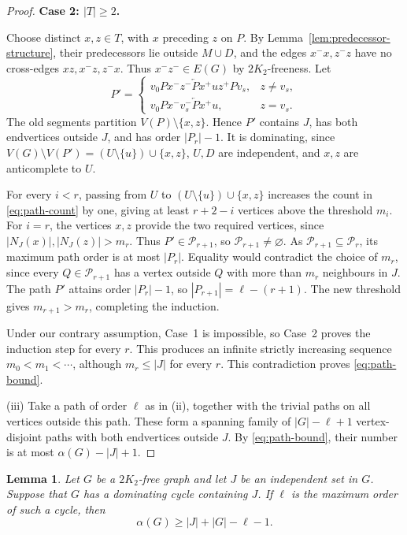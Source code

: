 \documentclass[11pt]{article}
\numberwithin{equation}{section}
\newtheorem{lemma}[theorem]{Lemma}
\theoremstyle{plain}
\theoremstyle{definition}
\theoremstyle{plain}
\begin{document}
\begin{proof}
\medskip
\noindent
\textbf{Case 2: $|T|\geq2$.}

Choose distinct $x,z\in T$, with $x$ preceding $z$ on $P$.
By Lemma~\ref{lem:predecessor-structure}, their predecessors
lie outside $M\cup D$, and the edges $x^-x,z^-z$ have no
cross-edges $xz,x^-z,z^-x$.
Thus $x^-z^-\in E(G)$ by $2K_2$-freeness. Let
\[
P'=
\begin{cases}
 v_0P x^-z^-\overleftarrow P x^+uz^+P v_s,
   &z\neq v_s,\\
 v_0P x^-v_s^-\overleftarrow P x^+u,
   &z=v_s.
\end{cases}
\]
The old segments partition $V(P)\setminus\{x,z\}$.
Hence $P'$ contains $J$, has both endvertices outside $J$,
and has order $|P_r|-1$. It is dominating, since
$V(G)\setminus V(P')=(U\setminus\{u\})\cup\{x,z\}$,
$U,D$ are independent, and $x,z$ are anticomplete to $U$.

For every $i<r$, passing from $U$ to $(U\setminus\{u\})\cup\{x,z\}$
increases the count in \eqref{eq:path-count} by one, giving
at least $r+2-i$ vertices above the threshold $m_i$.
For $i=r$, the vertices $x,z$ provide the two required vertices,
since $|N_J(x)|,|N_J(z)|>m_r$. Thus
$P'\in\mathcal P_{r+1}$, so $\mathcal P_{r+1}\neq\varnothing$.
As $\mathcal P_{r+1}\subseteq\mathcal P_r$, its maximum path
order is at most $|P_r|$. Equality would contradict the choice
of $m_r$, since every $Q\in\mathcal P_{r+1}$ has a vertex
outside $Q$ with more than $m_r$ neighbours in $J$.
The path $P'$ attains order $|P_r|-1$, so
$|P_{r+1}|=\ell-(r+1)$. The new threshold    gives
$m_{r+1}>m_r$, completing the induction.

Under our contrary assumption, Case~1 is impossible, so Case~2
proves the induction step for every $r$. This produces an infinite strictly
increasing sequence $m_0<m_1<\cdots$, although $m_r\leq|J|$
for every $r$. This contradiction proves \eqref{eq:path-bound}.

\medskip
\noindent
(iii) Take a path of order $\ell$ as in (ii), together with the
trivial paths on all vertices outside this path. These form a spanning family
of $|G|-\ell+1$ vertex-disjoint paths with both endvertices outside
$J$. By \eqref{eq:path-bound}, their number is at most
$\alpha(G)-|J|+1$.
\end{proof}

\begin{lemma}\label{lem:cycle}
Let $G$ be a $2K_2$-free graph and let $J$ be an independent set
in $G$. Suppose that $G$ has a dominating cycle containing $J$.
If $\ell$ is the maximum order of such a cycle, then
\begin{equation}\label{eq:cycle-bound}
    \alpha(G)\geq |J|+|G|-\ell-1.
\end{equation}
\end{lemma}
\end{document}
